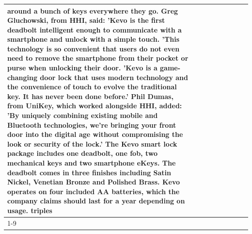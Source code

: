 \begin{table}[H]
\begin{tabular}{lllrlllll}
around a bunch of keys everywhere they go. Greg Gluchowski, from HHI, said: 'Kevo is the first deadbolt intelligent enough to communicate with a smartphone and unlock with a simple touch. 'This technology is so convenient that users do not even need to remove the smartphone from their pocket or purse when unlocking their door. 'Kevo is a game-changing door lock that uses modern technology and the convenience of touch to evolve the traditional key. It has never been done before.' Phil Dumas, from UniKey, which worked alongside HHI, added: 'By uniquely combining existing mobile and Bluetooth technologies, we’re bringing your front door into the digital age without compromising the look or security of the lock.' The Kevo smart lock package includes one deadbolt, one fob, two mechanical keys and two smartphone eKeys. The deadbolt comes in three finishes including Satin Nickel, Venetian Bronze and Polished Brass. Kevo operates on four included AA batteries, which the company claims should last for a year depending on usage. triples \\
\cline{1-9}

\end{tabular}
\end{table}
